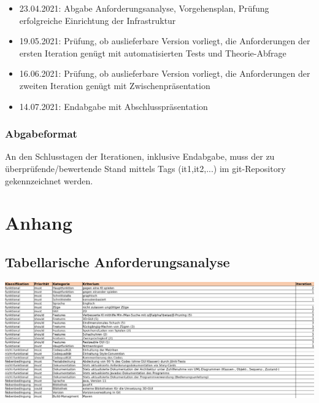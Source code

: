 \documentclass{scrreprt}
\begin{document}
\begin{itemize}
\item 23.04.2021: Abgabe Anforderungsanalyse, Vorgehensplan, Prüfung erfolgreiche Einrichtung der Infrastruktur

\item 19.05.2021: Prüfung, ob auslieferbare Version vorliegt, die Anforderungen der ersten Iteration genügt mit automatisierten Tests und Theorie-Abfrage

\item 16.06.2021: Prüfung, ob auslieferbare Version vorliegt, die
Anforderungen der zweiten Iteration genügt mit Zwischenpräsentation

\item 14.07.2021: Endabgabe mit Abschlusspräsentation
\end{itemize}

\subsection{Abgabeformat}
An den Schlusstagen der Iterationen, inklusive Endabgabe, muss der zu überprüfende/bewertende Stand mittels Tags (it1,it2,...) im git-Repository gekennzeichnet werden.








\chapter{Anhang}
\section{Tabellarische Anforderungsanalyse}
\includegraphics{resources/anforderungsanalyse_tabelle.png}
\end{document}
